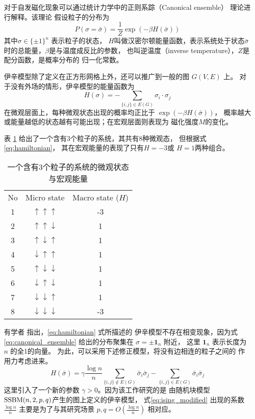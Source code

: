 对于自发磁化现象可以通过统计力学中的正则系踪（Canonical ensemble）
理论进行解释。该理论
假设粒子的分布为
\begin{equation}\label{eq:canonical_ensemble}
P(\sigma = \bar{\sigma}) = \frac{1}{Z} \exp(-\beta H(\bar{\sigma}))
\end{equation}
其中$\sigma \in \{\pm 1\}^n$ 表示粒子的状态，
$H$叫做汉密尔顿能量函数，表示系统处于状态$\bar{\sigma}$时的总能量，$\beta$是与温度成反比的参数，
也叫逆温度（inverse temperature），$Z$是配分函数，是概率分布的
归一化常数。

伊辛模型除了定义在正方形网格上外，还可以推广到一般的图 $G(V, E)$ 上。
对于没有外场的情形，伊辛模型的能量函数为
\begin{equation}\label{eq:hamiltonian}
	H(\sigma) = -\sum_{\{i,j\} \in E(G)} \sigma_i \cdot \sigma_j
\end{equation}
在微观层面上，每种微观状态出现的概率均正比于 $\exp(-\beta H(\bar{\sigma}))$，
概率越大或能量越低的状态越有可能出现；在宏观层面则表现为
磁化强度$M$的变化。

\begin{example}
  表 \ref{tab:particles_3} 给出了一个含有3个粒子的系统，其共有8种微观态，
  但根据式\eqref{eq:hamiltonian}， 其在宏观能量的表现了只有$H=-3$或 $H=1$两种组合。
\begin{table}
  \centering
\begin{tabular}{ccc}
		No & Micro state & Macro state ($H$) \\
		1 & $\uparrow\uparrow\uparrow$ & -3 \\
		2 & $\uparrow\uparrow\downarrow$ & 1 \\
		3 & $\uparrow\downarrow\uparrow$ & 1 \\
		4 & $\downarrow\uparrow\uparrow$ & 1 \\
		5 & $\uparrow\downarrow\downarrow$ & 1    \\
6 & $\downarrow\uparrow\downarrow$ & 1 \\
7 & $\downarrow\downarrow\uparrow$ & 1 \\
8 & $\downarrow\downarrow\downarrow$ & -3 \\
\end{tabular}
\caption{一个含有3个粒子的系统的微观状态与宏观能量}
\label{tab:particles_3}
\end{table}
\end{example}

有学者\cite{ye2020exact}
指出，\eqref{eq:hamiltonian} 式所描述的
伊辛模型不存在相变现象，因为式\eqref{eq:canonical_ensemble}
给出的分布聚集在 $\sigma=\pm \mathbf{1}_n$ 附近，
这里 $\mathbf{1}_n$ 表示长度为 $n$ 的全1的向量。
为此，可以采用下述修正模型，将没有边相连的粒子之间的
作用力考虑进来。
\begin{equation}\label{eq:ising_modified}
  H(\bar{\sigma}) = \gamma \frac{\log n}{n} \sum_{\{i,j\}\not\in E(G)}
  \bar{\sigma}_i  \bar{\sigma}_j
	- \sum_{\{i,j\}\in E(G)}
  \bar{\sigma}_i  \bar{\sigma}_j
\end{equation}
这里引入了一个新的参数 $\gamma > 0$。因为该工作研究的是
由随机块模型 $\operatorname{SSBM}(n,2,p,q)$产生的图上定义的伊辛模型，
式\eqref{eq:ising_modified} 出现的系数
$\frac{\log n}{n}$
主要是为了与其研究场景 $p,q=O(\frac{\log n}{n})$
相对应。

